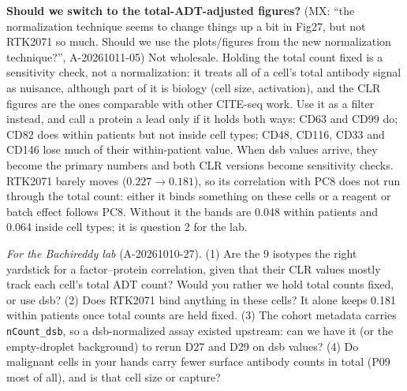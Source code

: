 \textbf{Should we switch to the total-ADT-adjusted figures?} (MX: ``the normalization technique seems to change things up a bit in Fig27, but not RTK2071 so much. Should we use the plots/figures from the new normalization technique?'', A-20261011-05) Not wholesale. Holding the total count fixed is a sensitivity check, not a normalization: it treats all of a cell's total antibody signal as nuisance, although part of it is biology (cell size, activation), and the CLR figures are the ones comparable with other CITE-seq work. Use it as a filter instead, and call a protein a lead only if it holds both ways: CD63 and CD99 do; CD82 does within patients but not inside cell types; CD48, CD116, CD33 and CD146 lose much of their within-patient value. When dsb values arrive, they become the primary numbers and both CLR versions become sensitivity checks. RTK2071 barely moves ($0.227 \to 0.181$), so its correlation with PC8 does not run through the total count: either it binds something on these cells or a reagent or batch effect follows PC8. Without it the bands are 0.048 within patients and 0.064 inside cell types; it is question 2 for the lab.

\emph{For the Bachireddy lab} (A-20261010-27). (1) Are the 9 isotypes the right yardstick for a factor--protein correlation, given that their CLR values mostly track each cell's total ADT count? Would you rather we hold total counts fixed, or use dsb? (2) Does RTK2071 bind anything in these cells? It alone keeps 0.181 within patients once total counts are held fixed. (3) The cohort metadata carries \texttt{nCount\_dsb}, so a dsb-normalized assay existed upstream: can we have it (or the empty-droplet background) to rerun D27 and D29 on dsb values? (4) Do malignant cells in your hands carry fewer surface antibody counts in total (P09 most of all), and is that cell size or capture?

